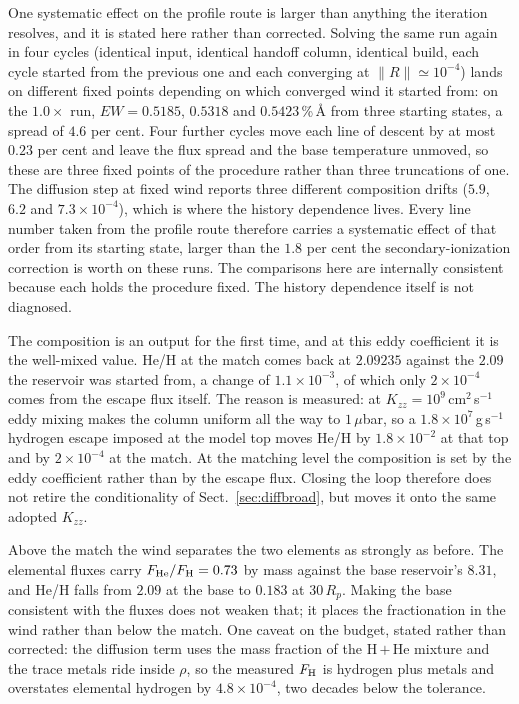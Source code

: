 \documentclass[english,a4paper]{my_memo}
\begin{document}
\medskip
\noindent One systematic effect on the profile route is larger than anything
the iteration resolves, and it is stated here rather than corrected. Solving
the same run again in four cycles (identical input, identical handoff column,
identical build, each cycle started from the previous one and each converging
at $\|R\| \simeq 10^{-4}$) lands on different fixed points depending on which
converged wind it started from: on the $1.0\times$ run, $EW = 0.5185$, $0.5318$
and $0.5423$\,\%\,\AA{} from three starting states, a spread of $4.6$ per
cent. Four further cycles move each line of descent by at most $0.23$ per
cent and leave the flux spread and the base temperature unmoved, so these are
three fixed points of the procedure rather than three truncations of one. The
diffusion step at fixed wind reports three different composition drifts
($5.9$, $6.2$ and $7.3\times10^{-4}$), which is where the history dependence
lives. Every line number taken from the profile route therefore carries a
systematic effect of that order from its starting state, larger than the
$1.8$ per cent the secondary-ionization correction is worth on these runs.
The comparisons here are internally consistent because each holds the
procedure fixed. The history dependence itself is not diagnosed.

\medskip
\noindent The composition is an output for the first time, and at this eddy
coefficient it is the well-mixed value. He/H at the match comes back at
$2.09235$ against the $2.09$ the reservoir was started from, a change of
$1.1\times10^{-3}$, of which only $2\times10^{-4}$ comes from the escape flux
itself. The reason is measured: at $K_{zz} = 10^{9}$\,cm$^2$\,s$^{-1}$ eddy
mixing makes the column uniform all the way to $1\,\mu$bar, so a
$1.8\times10^{7}$\,g\,s$^{-1}$ hydrogen escape imposed at the model top moves
He/H by $1.8\times10^{-2}$ at that top and by $2\times10^{-4}$ at the match.
At the matching level the composition is set by the eddy coefficient rather
than by the escape flux. Closing the loop therefore does not retire the
conditionality of Sect.~\ref{sec:diffbroad}, but moves it onto the same
adopted $K_{zz}$.

Above the match the wind separates the two elements as strongly as before.
The elemental fluxes carry $F_{\rm He}/F_{\rm H} = 0.73$ by mass against the
base reservoir's $8.31$, and He/H falls from $2.09$ at the base to $0.183$ at
$30\,R_p$. Making the base consistent with the fluxes does not weaken that;
it places the fractionation in the wind rather than below the match. One
caveat on the budget, stated rather than corrected: the diffusion term uses
the mass fraction of the H\,$+$\,He mixture and the trace metals ride inside
$\rho$, so the measured $F_{\rm H}$ is hydrogen plus metals and overstates
elemental hydrogen by $4.8\times10^{-4}$, two decades below the tolerance.
\end{document}
